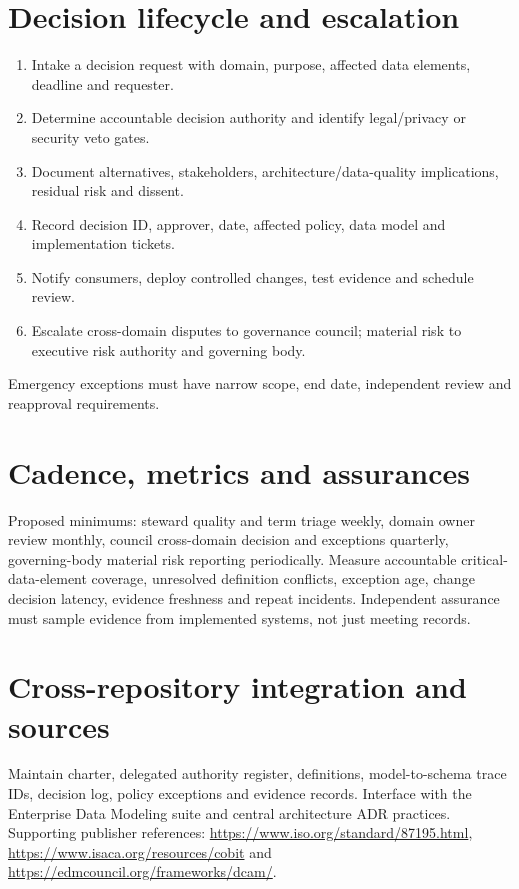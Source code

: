 \documentclass[11pt,letterpaper]{article}
\begin{document}
\section{Decision lifecycle and escalation}
\begin{enumerate}
\item Intake a decision request with domain, purpose, affected data elements, deadline and requester.
\item Determine accountable decision authority and identify legal/privacy or security veto gates.
\item Document alternatives, stakeholders, architecture/data-quality implications, residual risk and dissent.
\item Record decision ID, approver, date, affected policy, data model and implementation tickets.
\item Notify consumers, deploy controlled changes, test evidence and schedule review.
\item Escalate cross-domain disputes to governance council; material risk to executive risk authority and governing body.
\end{enumerate}
Emergency exceptions must have narrow scope, end date, independent review and reapproval requirements.

\section{Cadence, metrics and assurances}
Proposed minimums: steward quality and term triage weekly, domain owner review monthly, council cross-domain decision and exceptions quarterly, governing-body material risk reporting periodically. Measure accountable critical-data-element coverage, unresolved definition conflicts, exception age, change decision latency, evidence freshness and repeat incidents. Independent assurance must sample evidence from implemented systems, not just meeting records.

\section{Cross-repository integration and sources}
Maintain charter, delegated authority register, definitions, model-to-schema trace IDs, decision log, policy exceptions and evidence records. Interface with the Enterprise Data Modeling suite and central architecture ADR practices. Supporting publisher references: \url{https://www.iso.org/standard/87195.html}, \url{https://www.isaca.org/resources/cobit} and \url{https://edmcouncil.org/frameworks/dcam/}.
\end{document}
